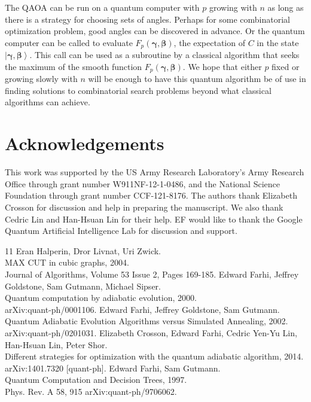 \documentclass[t11pt,reprint,preprint,preprintnumbers]{revtex4}
\newcommand{\ket}[1]{\left|#1\right\rangle}
\begin{document}
The QAOA can be run on a quantum computer with $p$ growing with $n$ as long as there is a strategy for choosing sets of angles.  Perhaps for some combinatorial optimization problem, good angles can be discovered in advance.  Or the quantum computer can be called to evaluate $F_p (\boldsymbol{\gamma}, \boldsymbol{\beta})$, the expectation of $C$ in the state $\ket{\boldsymbol{\gamma}, \boldsymbol{\beta}}$.  This call can be used as a subroutine by a classical algorithm that seeks the maximum of the smooth function $F_p(\boldsymbol{\gamma}, \boldsymbol{\beta})$.  We hope that either $p$ fixed or growing slowly with $n$ will be enough to have this quantum algorithm be of use in finding solutions to combinatorial search problems beyond what classical algorithms can achieve.  
\section{Acknowledgements}
This work was supported by the US Army Research Laboratory's Army Research Office
through grant number W911NF-12-1-0486, and the National Science Foundation through grant number
CCF-121-8176.  The authors thank Elizabeth Crosson for discussion and help in preparing the manuscript.  We also thank Cedric Lin and Han-Hsuan Lin for their help.  EF would like to thank the Google Quantum Artificial Intelligence Lab for discussion and support.
\begin{thebibliography}{11}
Eran Halperin, Dror Livnat, Uri Zwick.\\ 
MAX CUT in cubic graphs, 2004.\\  
\newblock Journal of Algorithms, Volume 53 Issue 2, Pages 169-185.
\vspace{10pt}
Edward Farhi, Jeffrey Goldstone, Sam Gutmann, Michael Sipser.\\
\newblock Quantum computation by adiabatic evolution, 2000.\\
\newblock arXiv:quant-ph/0001106.
\vspace{10pt}
Edward Farhi, Jeffrey Goldstone, Sam Gutmann.\\
\newblock Quantum Adiabatic Evolution Algorithms versus Simulated Annealing, 2002.\\
\newblock arXiv:quant-ph/0201031.
\vspace{10pt}
Elizabeth Crosson, Edward Farhi, Cedric Yen-Yu Lin, Han-Hsuan Lin, Peter Shor.\\
\newblock Different strategies for optimization with the quantum adiabatic algorithm, 2014.\\
\newblock arXiv:1401.7320 [quant-ph].
\vspace{10pt}
Edward Farhi, Sam Gutmann.\\
\newblock Quantum Computation and Decision Trees, 1997.\\
\newblock Phys. Rev. A 58, 915 arXiv:quant-ph/9706062.



\end{thebibliography}
\end{document}
